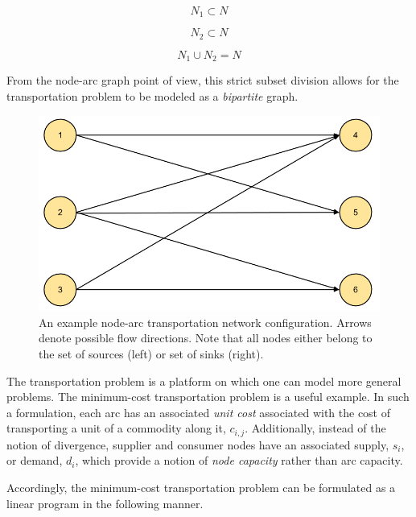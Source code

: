 \begin{equation}
  N_1 \subset N
\end{equation}

\begin{equation}
 N_2 \subset N
\end{equation}

\begin{equation}
  N_1 \cup N_2 = N
\end{equation}

From the node-arc graph point of view, this strict subset division allows for
the transportation problem to be modeled as a \textit{bipartite} graph.

\begin{figure}[H]
  \begin{center}
    \includegraphics[width=\linewidth]{./chapters/litreview/node-arcs-bipartite.png}
  \caption{An example node-arc transportation network configuration. Arrows
    denote possible flow directions. Note that all nodes either belong to the 
    set of sources (left) or set of sinks (right).}
  \label{fig:node-arcs-bipartite}
  \end{center}
\end{figure}

The transportation problem is a platform on which one can model more general
problems. The minimum-cost transportation problem is a useful example. In such a
formulation, each arc has an associated \textit{unit cost} associated with the
cost of transporting a unit of a commodity along it, $c_{i,j}$. Additionally,
instead of the notion of divergence, supplier and consumer nodes have an
associated supply, $s_i$, or demand, $d_i$, which provide a notion
of \textit{node capacity} rather than arc capacity.

Accordingly, the minimum-cost transportation problem can be formulated as a
linear program in the following manner.


